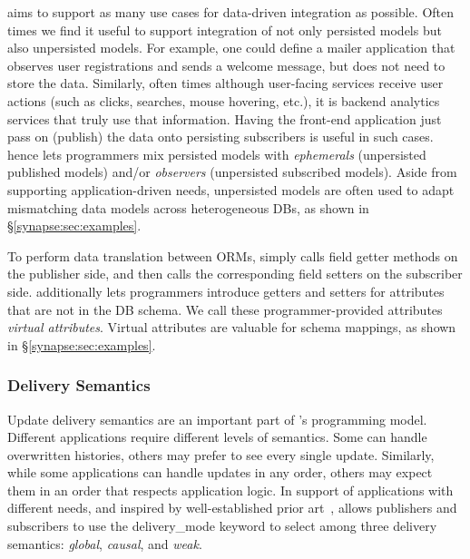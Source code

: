  \synapse aims to support as many use cases
for data-driven integration as possible.  Often times we find it useful to
support integration of not only persisted models but also unpersisted models.
For example, one could define a mailer application that observes user
registrations and sends a welcome message, but does not need to store the data.
Similarly, often times although user-facing services receive user actions
(such as clicks, searches, mouse hovering, etc.), it is backend analytics
services that truly use that information.  Having the front-end application just
pass on (publish) the data onto persisting subscribers is useful in such cases.
\synapse hence lets programmers mix persisted models with {\em ephemerals}
(unpersisted published models)
and/or {\em observers} (unpersisted subscribed models).  Aside from
supporting application-driven needs, unpersisted models are often used to
adapt mismatching data models across heterogeneous DBs, as shown in
\S\ref{synapse:sec:examples}.

 To perform data translation between ORMs,
\synapse simply calls field getter methods on the publisher side, and then
calls the corresponding field setters on the subscriber side. \synapse
additionally lets programmers introduce getters and setters for attributes
that are not in the DB schema.  We call these programmer-provided attributes
{\em virtual attributes}. Virtual attributes are valuable for schema mappings,
as shown in \S\ref{synapse:sec:examples}.

\endgroup

\subsubsection{\synapse Delivery Semantics}
\label{synapse:sec:semantics}
Update delivery semantics are an
important part of \synapse's programming model. Different applications
require different levels of semantics.  Some can handle overwritten histories,
others may prefer to see every single update.  Similarly, while some
applications can handle updates in any order, others may expect them in an
order that respects application logic. In support of applications with
different needs, and inspired by well-established prior
art~\cite{Lamport:1978:TCO:359545.359563}, \synapse allows
publishers and subscribers to use the {\code delivery\_mode} keyword
to select among three delivery semantics: {\em global},
{\em causal}, and {\em weak}.  

